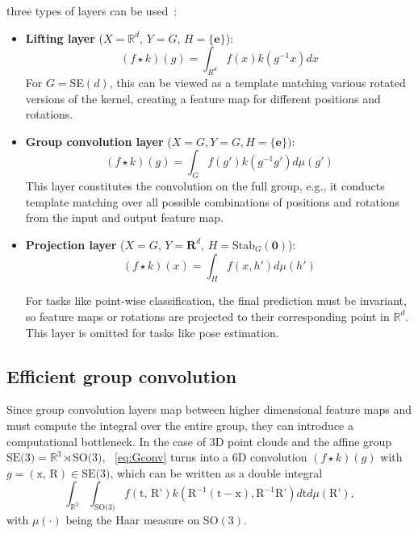 three types of layers can be used~\cite{bekkers2020bspline}:
\begin{itemize}
    \item \textbf{Lifting layer} ($X=\mathbb{R}^d$, $Y=G$, $H=\{\mathbf{e}\}$): 
    \begin{equation}
    (f \star k)(g) = \int_{R^d} f(x) k(g^{-1}x) dx
    \end{equation}
    For $G=$SE$(d)$, this can be viewed as a template matching various rotated versions of the kernel, creating a feature map for different positions and rotations.
    \item \textbf{Group convolution layer} ($X=G, Y=G, H=\{\mathbf{e}\})$:
    \begin{equation}
    (f \star k)(g) = \int_{G} f(g') k(g^{-1}g') d\mu(g')
    \label{eq:Gconv}
    \end{equation}
    This layer constitutes the convolution on the full group, e.g., it conducts template matching over all possible combinations of positions and rotations from the input and output feature map.
    \item \textbf{Projection layer} ($X=G$, $Y=\mathbf{R}^d$, $H=\text{Stab}_G(\mathbf{0})$):
    \begin{equation}
    (f \star k)(x) = \int_{H} f(x,h')  d\mu(h')
    \label{eq:proj-layer}
    \end{equation}

    For tasks like point-wise classification, the final prediction must be invariant, so feature maps or rotations are projected to their corresponding point in $\mathbb{R}^d$. This layer is omitted for tasks like pose estimation.
\end{itemize}






\subsection{Efficient group convolution}
Since group convolution layers map between higher dimensional feature maps and must compute the integral over the entire group, they can introduce a computational bottleneck. In the case of 3D point clouds and the affine group $\text{SE(3)} = \mathbb{R}^3 \rtimes \text{SO(3)}$, ~\cref{eq:Gconv} turns into a 6D convolution $(f \star k)(g)$ with $g=(\text{x, R}) \in \text{SE(3)}$, which can be written as a double integral
\begin{equation}
\int_{\mathbb{R}^3} \int_{\text{SO(3)}} f(\text{t, R'})k(\text{R}^{-1}(\text{t} - \text{x}), \text{R}^{-1}\text{R'}) d\text{t} d\mu(\text{R'}),
\label{eq:double-int}
\end{equation}
with $\mu(\cdot)$ being the Haar measure on SO$(3)$. 



